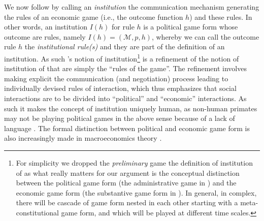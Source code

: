 \documentclass[12pt]{article}
\begin{document}
We now follow \citet[p.~128]{Hurwicz96} by calling an \textit{institution} the communication mechanism generating the rules of an economic game (i.e., the outcome function $h$) and these rules. In other words, an institution $I(h)$ for rule $h$ is a political game form whose outcome are rules, namely $I(h)=(\mathcal{M},p,h)$, whereby we can call the outcome rule $h$ the \textit{institutional rule(s)} and they are part of the definition of an institution. As such \citeauthor{Hurwicz96}'s notion of institution\footnote{For simplicity we dropped the \textit{preliminary} game the definition of institution of \citet[p.~128]{Hurwicz96} as what really matters for our argument is the conceptual distinction between the political game form (the administrative game in \citet{Hurwicz96}) and the economic game form (the substantive game form in \citet{Hurwicz96}). In general, in complex, there will be cascade of game form nested in each other starting with a meta-constitutional game form, and which will be played at different time scales. } is a refinement of the notion of institution of \cite{North90} that are simply the ``rules of the game''. The refinement involves making explicit the communication (and negotiation) process leading to individually devised rules of interaction, which thus emphasizes that social interactions are to be divided into ``political'' and ``economic'' interactions.  As such it makes the concept of institution uniquely human, as non-human primates may not be playing political games in the above sense because of a lack of language \citep{PowersVSL16}. The formal distinction between political and economic game form is also increasingly made in macroeconomics theory \citep[p.~779]{Acemoglu09}.


 
 








\end{document}
